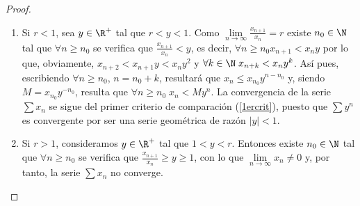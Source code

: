\begin{proof}
	\begin{enumerate}
		\item Si \(r < 1\), sea \(y \in \R^{+}\) tal que \(r < y < 1\). Como \(\lim\limits_{n \to \infty} \frac{x_{n+1}}{x_n} = r \) existe \(n_0 \in \N \) tal que \(\forall n \geq  n_0\) se verifica que \(\frac{x_{n+1} }{x_n} < y\), es decir, \(\forall n \geq n_0 x_{n+1} < x_n y\) por lo que, obviamente, \(x_{n+2} < x_{n+1} y < x_n y^{2}\) y \(\forall k \in \N \; x_{n+k} < x_n y^{k} \). Así pues, escribiendo \(\forall n \geq n_0\), \(n = n_0 + k\), resultará que \(x_n \leq x_{n_0} y^{n -n_0}\) y, siendo \(M = x_{n_0} y^{-n_0}\), resulta que \(\forall n \geq n_0 \; x_n < M y^{n}\). La convergencia de la serie \(\sum x_n \) se sigue del primer criterio de comparación (\ref{1ercrit}), puesto que \(\sum y^{n }	\) es convergente por ser una serie geométrica de razón \(\left\vert y  \right\vert < 1	\).
		\item Si \(r > 1 \), consideramos \(y \in \R^{+ }\) tal que \(1 < y < r\). Entonces existe \(n_0 \in \N \) tal que \(\forall n \geq n_0 \) se verifica que \(\frac{x_{n+1} }{x_n} \geq y \geq 1\), con lo que \(\lim\limits_{n \to \infty} x_n \neq 0\) y, por tanto, la serie \(\sum x_n \) no converge.
	\end{enumerate}
\end{proof}

\vspace{0.3cm}
